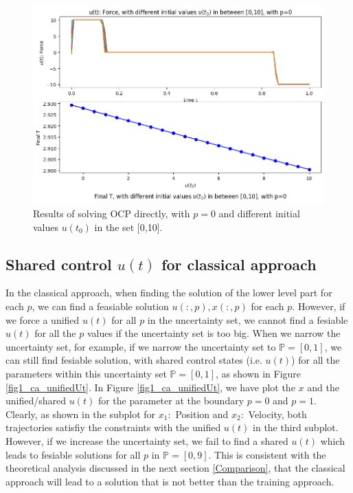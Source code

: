 \documentclass  [
  paper    = a4,
  BCOR     = 10mm,
  twoside,
  fontsize = 12pt,
  fleqn,
  toc      = bibnumbered,
  toc      = listofnumbered,
  numbers  = noendperiod,
  headings = normal,
  listof   = leveldown,
  version  = 3.03
]                                       {scrreprt}
\newcommand{\<}{\langle}
\renewcommand{\>}{\rangle}
\begin{document}
 \begin{figure}[h]
	\centerline{\includegraphics[width=12cm]{initial_value.png}}
	\caption{Results of solving OCP directly, with $p=0$ and different initial values $u(t_0)$ in the set [0,10]. }
	\label{fig1_initialUt}
\end{figure}\textbf{}



\subsection{Shared control $u(t)$ for classical approach}
\label{Sec_ShareUt}
In the classical approach, when finding the solution of the lower level part for each $p$, we can find a feasiable solution $u(:,p), x(:,p)$ for each $p$. However, if we force a unified $u(t)$ for all $p$ in the uncertainty set, we cannot find a fesiable $u(t)$ for all the $p$ values if the uncertainty set is too big.  When we narrow the uncertainty set, for example, if we narrow the uncertainty set to $\mathbb{P}=[0,1]$, we can still find fesiable solution, with shared control states (i.e. $u(t)$) for all the parameters within this uncertainty set $\mathbb{P}=[0,1]$, as shown in Figure \ref{fig1_ca_unifiedUt}. In Figure  \ref{fig1_ca_unifiedUt}, we have plot the $x$ and the unified/shared $u(t)$ for the parameter at the boundary $p=0$ and $p=1$. Clearly, as shown in the subplot for $x_1:$ Position and $x_2:$ Velocity, both trajectories satisfiy the constraints with the unified $u(t)$ in the third subplot. However, if we increase the uncertainty set, we fail to find a shared $u(t)$ which leads to fesiable solutions for all $p$ in $\mathbb{P}=[0,9]$.  This is consistent with the theoretical analysis discussed in the next section \ref{Comparison}, that the classical approach will lead to a solution that is not better than the training approach. 
\end{document}
